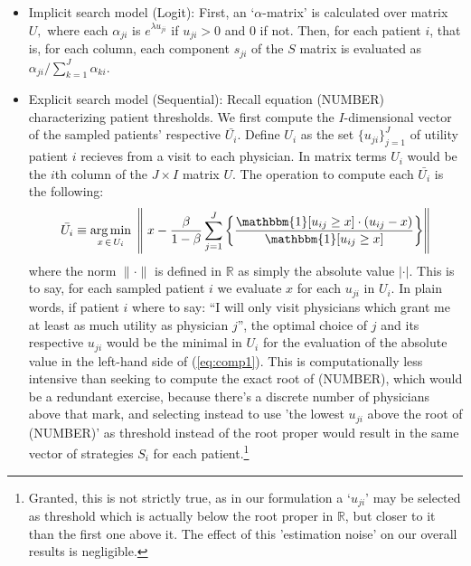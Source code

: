 \documentclass[../main.tex]{subfiles}
\begin{document}
\begin{itemize}
    \item Implicit search model (Logit): First, an `$\alpha$-matrix' is calculated over matrix $U,$ where each $\alpha_{ji}$ is $e^{\lambda u_{ji}}$ if $u_{ji} > 0$ and $0$ if not. Then, for each patient $i$, that is, for each column, each component $s_{ji}$ of the $S$ matrix is evaluated as $\alpha_{ji}/\sum_{k = 1}^{J} \alpha_{ki}$.

    \item Explicit search model (Sequential): Recall equation (NUMBER) characterizing patient thresholds. We first compute the $I$-dimensional vector of the sampled patients' respective $\bar{U_i}$. Define $U_i$ as the set $\{u_{ji}\}_{j=1}^{J}$ of utility patient $i$ recieves from a visit to each physician. In matrix terms $U_i$ would be the $i$th column of the $J \times I$ matrix $U$. The operation to compute each $\bar{U_i}$ is the following:
    \begin{equation}
    \bar{U_i} \equiv \argmin_{x \, \in \, U_i}\; \left\|  \; x - \frac{\beta}{1-\beta}  \sum_{j=1}^{J} \left\{ \frac{\mathbbm{1}[ u_{ij} \geq x ] \cdot (u_{ij} - x)}{\mathbbm{1}[ u_{ij} \geq x ]} \right\} \right\|
    \label{eq:comp1}
    \end{equation}
    where the norm $\| \cdot \|$ is defined in $\mathbb{R}$ as simply the absolute value $| \cdot |$. This is to say, for each sampled patient $i$ we evaluate $x$ for each $u_{ji}$ in $U_i$. In plain words, if patient $i$ where to say: ``I will only visit physicians which grant me at least as much utility as physician $j$'', the optimal choice of $j$ and its respective $u_{ji}$ would be the minimal in $U_i$ for the evaluation of the absolute value in the left-hand side of (\ref{eq:comp1}). This is computationally less intensive than seeking to compute the exact root of (NUMBER), which would be a redundant exercise, because there's a discrete number of physicians above that mark, and selecting instead to use 'the lowest $u_{ji}$ above the root of (NUMBER)' as threshold instead of the root proper would result in the same vector of strategies $S_i$ for each patient.\footnote{Granted, this is not strictly true, as in our formulation a `$u_{ji}$' may be selected as threshold which is actually below the root proper in $\mathbb{R}$, but closer to it than the first one above it. The effect of this 'estimation noise' on our overall results is negligible.}
\end{itemize}


\newpage
\end{document}
